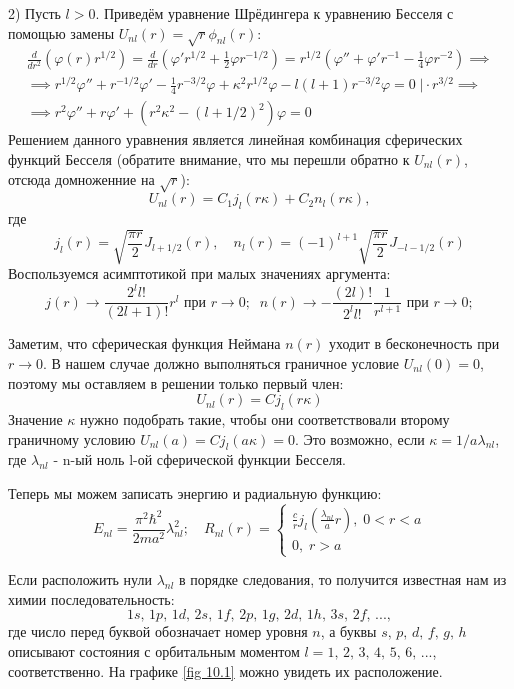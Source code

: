 2) Пусть $l > 0$. Приведём уравнение Шрёдингера к уравнению Бесселя с помощью замены $U_{nl}(r) = \sqrt{r}\phi_{nl}(r)$:
\begin{gather*}
\frac{d}{dr^2}\left(\varphi(r)r^{1/2}\right) = \frac{d}{dr}\left( \varphi'r^{1/2} + \frac{1}{2}\varphi r^{-1/2} \right) = r^{1/2}\left(\varphi'' + \varphi'r^{-1} - \frac{1}{4}\varphi r^{-2}\right) \implies \\
\implies r^{1/2}\varphi'' + r^{-1/2}\varphi' - \frac{1}{4}r^{-3/2}\varphi + \kappa^2r^{1/2}\varphi - l(l+1)r^{-3/2}\varphi = 0 \; \Bigg| \cdot r^{3/2} \implies \\
\implies r^2\varphi''+ r\varphi' + (r^2\kappa^2 - (l+1/2)^2)\varphi = 0
\end{gather*}
Решением данного уравнения является линейная комбинация сферических функций Бесселя (обратите внимание, что мы перешли обратно к $U_{nl}(r)$, отсюда домноженние на $\sqrt{r}$):
\[
U_{nl}(r) = C_1j_l(r\kappa) + C_2n_l(r\kappa),
\]
где
\[
j_l(r) = \sqrt{\frac{\pi r}{2}}J_{l+1/2}(r), \quad n_l(r) = (-1)^{l+1}\sqrt{\frac{\pi r}{2}}J_{-l-1/2}(r)
\]
Воспользуемся асимптотикой при малых значениях аргумента:
\[
j(r)\rightarrow\frac{2^l l!}{(2l+1)!}r^l \text{ при } r\rightarrow0; \;\; n(r)\rightarrow -\frac{(2l)!}{2^l l!}\frac{1}{r^{l+1}} \text{ при } r\rightarrow 0; 
\]

Заметим, что сферическая функция Неймана $n(r)$ уходит в бесконечность при $r \rightarrow 0$. В нашем случае должно выполняться граничное условие $U_{nl}(0) = 0$, поэтому мы оставляем в решении только первый член:
\[
U_{nl}(r) = Cj_l(r\kappa)
\]
Значение $\kappa$ нужно подобрать такие, чтобы они соответствовали второму граничному условию $U_{nl}(a) = Cj_l(a\kappa) = 0$. Это возможно, если $\kappa = 1/a \lambda_{nl}$, где $\lambda_{nl}$ - n-ый ноль l-ой сферической функции Бесселя. 

Теперь мы можем записать энергию и радиальную функцию:
\[
E_{nl} = \frac{\pi^2\hbar^2}{2ma^2}\lambda_{nl}^2;\quad R_{nl}(r) =
\begin{cases}
    \frac{c}{r}j_{l}\left( \frac{\lambda_{nl}}{a}r \right), \; 0 < r < a\\
    0, \; r > a
\end{cases}
\]

Если расположить нули $\lambda_{nl}$ в порядке следования, то получится известная нам из химии последовательность:
\[
1s,\,1p,\,1d,\,2s,\,1f,\,2p,\,1g,\,2d,\,1h,\,3s,\,2f,\, ...,
\]
где число перед буквой обозначает номер уровня $n$, а буквы $s,\,p,\,d,\,f,\,g,\,h$ описывают состояния с орбитальным моментом $l=1,\,2,\,3,\,4,\,5,\,6,\,...$, соответственно. На графике \ref{fig 10.1} можно увидеть их расположение.


